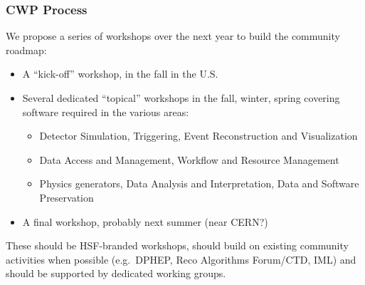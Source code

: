 \begin{frame}
\frametitle{CWP Process}

We propose a series of workshops over the next year to build the community roadmap:

\begin{itemize}
\item A ``kick-off'' workshop, in the fall in the U.S.
\item Several dedicated ``topical'' workshops in the {fall, winter, spring} covering software required in the various areas:
\begin{itemize}
\item Detector Simulation, Triggering, Event Reconstruction and Visualization
\item Data Access and Management, Workflow and Resource Management
\item Physics generators, Data Analysis and Interpretation, Data and Software Preservation
\end{itemize}
\item A final workshop, probably next summer (near CERN?)
\end{itemize}

These should be HSF-branded workshops, should build on existing community activities when possible (e.g.\ DPHEP, Reco Algorithms Forum/CTD, IML) and should be supported by dedicated working groups.

\end{frame}


